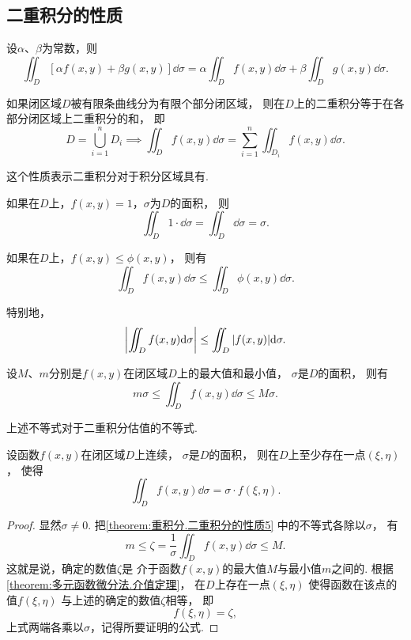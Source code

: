 \subsection{二重积分的性质}
\begin{property}\label{theorem:重积分.二重积分的性质1}
设\(\alpha\)、\(\beta\)为常数，则\[
\iint_D [\alpha f(x,y)+\beta g(x,y)] \dd\sigma
=\alpha \iint_D f(x,y) \dd\sigma
+\beta \iint_D g(x,y) \dd\sigma.
\]
\end{property}

\begin{property}\label{theorem:重积分.二重积分的性质2}
如果闭区域\(D\)被有限条曲线分为有限个部分闭区域，
则在\(D\)上的二重积分等于在各部分闭区域上二重积分的和，
即\[
	D = \bigcup_{i=1}^n D_i
	\implies
	\iint_D f(x,y) \dd\sigma
	= \sum_{i=1}^n \iint_{D_i} f(x,y) \dd\sigma.
\]
\end{property}
这个性质表示二重积分对于积分区域具有.

\begin{property}\label{theorem:重积分.二重积分的性质3}
如果在\(D\)上，\(f(x,y)=1\)，\(\sigma\)为\(D\)的面积，
则\[
	\iint_D 1\cdot\dd\sigma
	=\iint_D \dd\sigma
	=\sigma.
\]
\end{property}

\begin{property}\label{theorem:重积分.二重积分的性质4}
如果在\(D\)上，\(f(x,y) \leq \phi(x,y)\)，
则有\[
	\iint_D f(x,y) \dd\sigma \leq \iint_D \phi(x,y) \dd\sigma.
\]

特别地，\[
	\abs{\iint_D f(x,y) \dd\sigma} \leq \iint_D \abs{f(x,y)} \dd\sigma.
\]
\end{property}

\begin{property}\label{theorem:重积分.二重积分的性质5}
设\(M\)、\(m\)分别是\(f(x,y)\)在闭区域\(D\)上的最大值和最小值，
\(\sigma\)是\(D\)的面积，
则有\[
	m\sigma \leq \iint_D f(x,y) \dd\sigma \leq M\sigma.
\]
\end{property}
上述不等式对于二重积分估值的不等式.

\begin{property}[二重积分的中值定理]\label{theorem:重积分.二重积分的中值定理}
设函数\(f(x,y)\)在闭区域\(D\)上连续，
\(\sigma\)是\(D\)的面积，
则在\(D\)上至少存在一点\((\xi,\eta)\)，
使得\[
	\iint_D f(x,y) \dd\sigma = \sigma \cdot f(\xi,\eta).
\]
\begin{proof}
显然\(\sigma\neq0\).
把\cref{theorem:重积分.二重积分的性质5} 中的不等式各除以\(\sigma\)，
有\[
	m
	\leq
	\zeta = \frac{1}{\sigma} \iint_D f(x,y) \dd\sigma
	\leq
	M.
\]
这就是说，确定的数值\(\zeta\)是
介于函数\(f(x,y)\)的最大值\(M\)与最小值\(m\)之间的.
根据\cref{theorem:多元函数微分法.介值定理}，
在\(D\)上存在一点\((\xi,\eta)\)
使得函数在该点的值\(f(\xi,\eta)\)
与上述的确定的数值\(\zeta\)相等，
即\[
	f(\xi,\eta) = \zeta,
\]
上式两端各乘以\(\sigma\)，记得所要证明的公式.
\end{proof}
\end{property}

